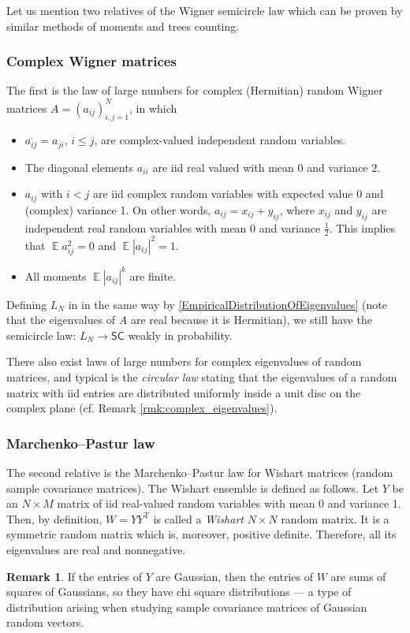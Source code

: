 \documentclass[letterpaper,11pt,oneside,reqno]{amsart}
\numberwithin{equation}{section}
\newcommand{\SC}{\mathsf{SC}}
\DeclareMathOperator{\EE}{\mathbb{E}}
\theoremstyle{definition}
\newtheorem{remark}[proposition]{Remark}
\begin{document}
Let us mention two relatives of the Wigner semicircle law which can be proven by similar 
methods of moments and
trees counting.

\subsubsection{Complex Wigner matrices} %
\label{ssub:complex_wigner_matrices}
	
The first is the law of large numbers for complex (Hermitian) random Wigner
matrices $A= ( a_{ i j } )_{i,j=1}^{N}$, in which
\begin{itemize}
	\item $ \overline{ a_{ i j } } = a_{ j i } $, $i\le j$,
	are complex-valued independent random variables.
	\item The diagonal elements
	$ a_{ i i } $ are iid real valued with mean $0$ and variance $2$.
	\item $ a_{ i j } $ with $ i < j $ are iid complex random variables
	with expected value 0 and (complex) variance 1.
	On other words, $a_{ij}=x_{ij}+y_{ij}$, where $x_{ij}$ and $y_{ij}$ are independent
	real random variables with mean $0$ and variance $\frac12$. This implies that 
	$\EE a_{ij}^{2}=0$ and $\EE |a_{ij}|^{2}=1$.
	\item All moments $\EE|a_{ij}|^{k}$ are finite.
\end{itemize}
Defining $L_N$ in in the same way by \eqref{EmpiricalDistributionOfEigenvalues}
(note that the eigenvalues of $A$ are real because it is Hermitian),
we still have the semicircle law: 
$ L_N \rightarrow \SC $ weakly in probability.

There also exist laws of large numbers
for complex eigenvalues of random matrices,
and typical is the \emph{circular law} stating
that the eigenvalues of a random matrix with iid 
entries are distributed uniformly inside a unit disc on the 
complex plane (cf. Remark \ref{rmk:complex_eigenvalues}).



\subsubsection{Marchenko--Pastur law} %
\label{ssub:marchenko_pastur_law}

The second relative is the Marchenko--Pastur law \cite{MarchenkoPastur}
for Wishart matrices (random sample covariance matrices). The Wishart ensemble is defined as follows.
Let $ Y $ be an $ N \times M $ matrix of iid real-valued random variables with mean 0 and variance 1. 
Then, by definition, $ W = Y Y^\text{T} $ is called a \emph{Wishart} $ N \times N $ random matrix.
It is a symmetric random matrix which is, moreover, positive definite.
Therefore, all its eigenvalues are real and nonnegative.
\begin{remark}
	If the entries of $ Y $ are Gaussian, then the entries of $ W $ are sums of squares of Gaussians, 
	so they have chi square distributions --- a type of distribution
	arising when studying sample covariance matrices of Gaussian random vectors.
\end{remark}
\end{document}
